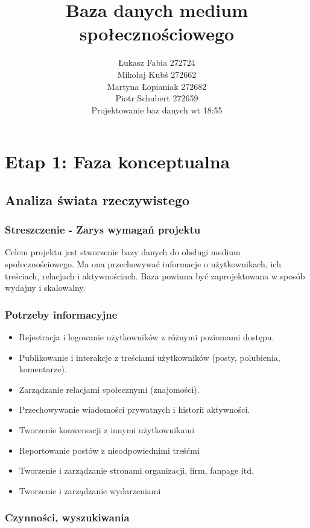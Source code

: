\documentclass{article}
\title{Baza danych medium społecznościowego}
\author{Łukasz Fabia 272724 \\ Mikołaj Kubś 272662 \\ Martyna Łopianiak 272682 \\ Piotr Schubert 272659 \\ Projektowanie baz danych wt 18:55}
\begin{document}
\maketitle

\tableofcontents

\section{Etap 1: Faza konceptualna}

\subsection{Analiza świata rzeczywistego}

\subsubsection{Streszczenie - Zarys wymagań projektu}

Celem projektu jest stworzenie bazy danych do obsługi medium społecznościowego. Ma ona przechowywać informacje o użytkownikach, ich treściach, relacjach i aktywnościach. Baza powinna być zaprojektowana w sposób wydajny i skalowalny.

\subsubsection{Potrzeby informacyjne}
\begin{itemize}
    \item Rejestracja i logowanie użytkowników z różnymi poziomami dostępu.
    \item Publikowanie i interakcje z treściami użytkowników (posty, polubienia, komentarze).
    \item Zarządzanie relacjami społecznymi (znajomości).
    \item Przechowywanie wiadomości prywatnych i historii aktywności.
    \item Tworzenie konwersacji z innymi użytkownikami
    \item Reportowanie postów z nieodpowiednimi treśćmi
    \item Tworzenie i zarządzanie stronami organizacji, firm, fanpage itd.
    \item Tworzenie i zarządzanie wydarzeniami
\end{itemize}

\subsubsection{Czynności, wyszukiwania}
\end{document}
